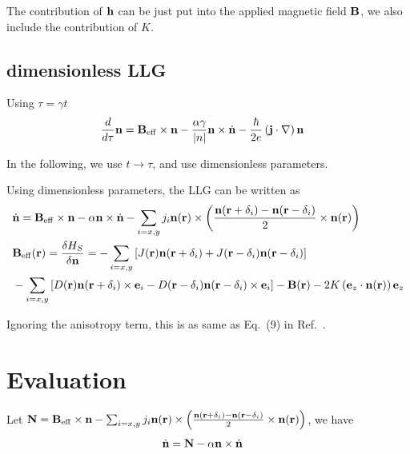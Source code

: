 \documentclass[aps,superscriptaddress,groupedaddress]{revtex4}  %
\begin{document}
The contribution of ${\bf h}$ can be just put into the applied magnetic field ${\bf B}$, we also include the contribution of $K$.

\subsection{\label{sec:2.6}dimensionless LLG}

Using $\tau = \gamma t$
\begin{equation}
\begin{split}
&\frac{d}{d\tau} {\bf n}= {\bf B}_{\rm eff}\times {\bf n}-\frac{\alpha \gamma}{|n|} {\bf n}\times \dot{\bf n}-\frac{\hbar }{2e}\left({\bf j}\cdot {\bf \nabla}\right){\bf n}
\end{split}
\end{equation}

In the following, we use $t\to \tau$, and use dimensionless parameters.

Using dimensionless parameters, the LLG can be written as
\begin{equation}
\begin{split}
&\dot {\bf n}={\bf B}_{\rm eff}\times {\bf n}-\alpha {\bf n}\times \dot{\bf n}-\sum _{i=x,y}j_i{\bf n}({\bf r})\times \left(\frac{{\bf n}({\bf r}+\delta _i)-{\bf n}({\bf r}-\delta _i)}{2}\times {\bf n}({\bf r})\right)\\
&{\bf B}_{\rm eff}({\bf r})=\frac{\delta H_S}{\delta {\bf n}}=-\sum _{i=x,y}\left[J({\bf r}){\bf n}({\bf r}+\delta_i)+J({\bf r}-\delta_i){\bf n}({\bf r}-\delta_i)\right]\\
&-\sum _{i=x,y}\left[D({\bf r}){\bf n}({\bf r}+\delta_i)\times {{\bf e}}_i-D({\bf r}-\delta _i){\bf n}({\bf r}-\delta_i)\times {{\bf e}}_i\right]-{\bf B}({\bf r})-2K \left({\bf e}_z\cdot {\bf n}({\bf r})\right){\bf e}_z
\end{split}
\end{equation}

Ignoring the anisotropy term, this is as same as Eq.~(9) in Ref.~\cite{pin}.

\section{\label{sec:3}Evaluation}

Let ${\bf N}={\bf B}_{\rm eff}\times {\bf n}-\sum _{i=x,y}j_i{\bf n}({\bf r})\times \left(\frac{{\bf n}({\bf r}+\delta _i)-{\bf n}({\bf r}-\delta _i)}{2}\times {\bf n}({\bf r})\right)$, we have
\begin{equation}
\begin{split}
&\dot {\bf n}={\bf N}-\alpha {\bf n}\times \dot{\bf n}
\end{split}
\end{equation}
\end{document}
